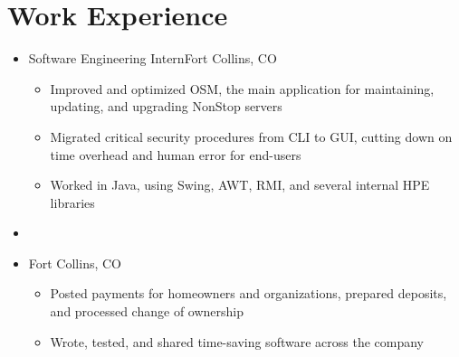 \documentclass[10pt,letterpaper,sans]{moderncv}
\renewcommand{\_}{\textscale{.7}{\textunderscore}}
\begin{document}
\section{Work Experience}
\begin{itemize}
\item{
  {Software Engineering Intern}{Fort Collins, CO}{}{
    \begin{itemize}
    \item Improved and optimized OSM, the main application for maintaining, updating,
      and upgrading NonStop servers
    \item Migrated critical security procedures from CLI to GUI, cutting down on time
      overhead and human error for end-users
    \item Worked in Java, using Swing, AWT, RMI, and several internal HPE libraries
    \end{itemize}
}}
\item{}
\item{
  {Fort Collins, CO}{}{
    \begin{itemize}
    \item Posted payments for homeowners and organizations, prepared deposits,
      and processed change of ownership
    \item Wrote, tested, and shared time-saving software across the company
    \end{itemize}
}}
\end{itemize}
\end{document}
